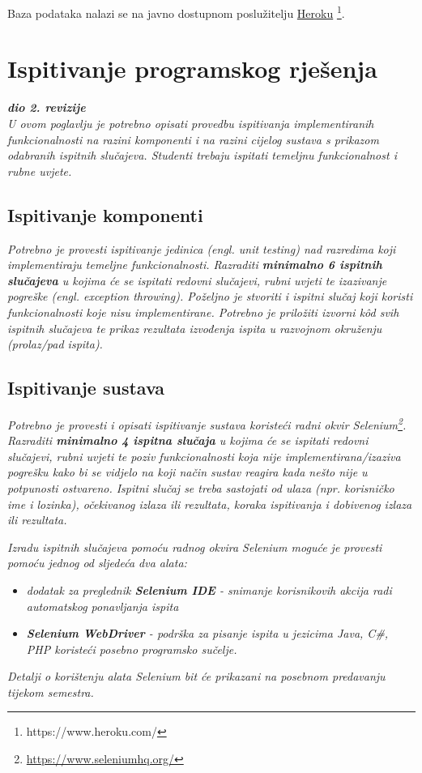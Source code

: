 			 Baza podataka nalazi se na javno dostupnom poslužitelju \underline{Heroku} \footnote{https://www.heroku.com/}.
			
			
			\eject 
		
	
		\section{Ispitivanje programskog rješenja}
			
			\textbf{\textit{dio 2. revizije}}\\
			
			 \textit{U ovom poglavlju je potrebno opisati provedbu ispitivanja implementiranih funkcionalnosti na razini komponenti i na razini cijelog sustava s prikazom odabranih ispitnih slučajeva. Studenti trebaju ispitati temeljnu funkcionalnost i rubne uvjete.}
	
			
			\subsection{Ispitivanje komponenti}
			\textit{Potrebno je provesti ispitivanje jedinica (engl. unit testing) nad razredima koji implementiraju temeljne funkcionalnosti. Razraditi \textbf{minimalno 6 ispitnih slučajeva} u kojima će se ispitati redovni slučajevi, rubni uvjeti te izazivanje pogreške (engl. exception throwing). Poželjno je stvoriti i ispitni slučaj koji koristi funkcionalnosti koje nisu implementirane. Potrebno je priložiti izvorni kôd svih ispitnih slučajeva te prikaz rezultata izvođenja ispita u razvojnom okruženju (prolaz/pad ispita). }
			
			
			
			\subsection{Ispitivanje sustava}
			
			 \textit{Potrebno je provesti i opisati ispitivanje sustava koristeći radni okvir Selenium\footnote{\url{https://www.seleniumhq.org/}}. Razraditi \textbf{minimalno 4 ispitna slučaja} u kojima će se ispitati redovni slučajevi, rubni uvjeti te poziv funkcionalnosti koja nije implementirana/izaziva pogrešku kako bi se vidjelo na koji način sustav reagira kada nešto nije u potpunosti ostvareno. Ispitni slučaj se treba sastojati od ulaza (npr. korisničko ime i lozinka), očekivanog izlaza ili rezultata, koraka ispitivanja i dobivenog izlaza ili rezultata.\\ }
			 
			 \textit{Izradu ispitnih slučajeva pomoću radnog okvira Selenium moguće je provesti pomoću jednog od sljedeća dva alata:}
			 \begin{itemize}
			 	\item \textit{dodatak za preglednik \textbf{Selenium IDE} - snimanje korisnikovih akcija radi automatskog ponavljanja ispita	}
			 	\item \textit{\textbf{Selenium WebDriver} - podrška za pisanje ispita u jezicima Java, C\#, PHP koristeći posebno programsko sučelje.}
			 \end{itemize}
		 	\textit{Detalji o korištenju alata Selenium bit će prikazani na posebnom predavanju tijekom semestra.}
			
